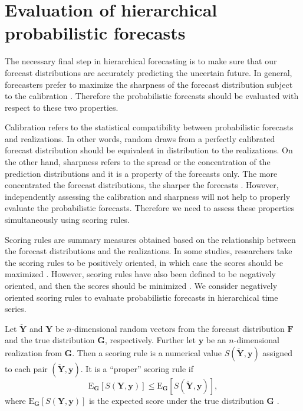 \documentclass[a4paper, 11pt]{article}
\def\E{\text{E}}
\begin{document}
\section{Evaluation of hierarchical probabilistic forecasts}\label{sec:evaluation}

The necessary final step in hierarchical forecasting is to make sure that our forecast distributions are accurately predicting the uncertain future. In general, forecasters prefer to maximize the sharpness of the forecast distribution subject to the calibration \citep{Gneiting2014}. Therefore the probabilistic forecasts should be evaluated with respect to these two properties.

Calibration refers to the statistical compatibility between probabilistic forecasts and realizations. In other words, random draws from a perfectly calibrated forecast distribution should be equivalent in distribution to the realizations. On the other hand, sharpness refers to the spread or the concentration of the prediction distributions and it is a property of the forecasts only. The more concentrated the forecast distributions, the sharper the forecasts \citep{Gneiting2008}. However, independently assessing the calibration and sharpness will not help to properly evaluate the probabilistic forecasts. Therefore we need to assess these properties simultaneously using scoring rules.

Scoring rules are summary measures obtained based on the relationship between the forecast distributions and the realizations. In some studies, researchers take the scoring rules to be positively oriented, in which case the scores should be maximized \citep{Gneiting2007}. However, scoring rules have also been defined to be negatively oriented, and then the scores should be minimized \citep{Gneiting2014}. We consider negatively oriented scoring rules to evaluate probabilistic forecasts in hierarchical time series.

Let $\breve{\bm{Y}}$ and $\bm{Y}$ be $n$-dimensional random vectors from the forecast distribution $\bm{F}$ and the true distribution $\bm{G}$, respectively. Further let $\bm{y}$ be an $n$-dimensional realization from $\bm{G}$. Then a scoring rule is a numerical value $S(\breve{\bm{Y}},\bm{y})$ assigned to each pair $(\breve{\bm{Y}},\bm{y})$. It is a ``proper'' scoring rule if 
\begin{equation}\label{eq:(3.1.)}
\E_{\bm{G}}[S(\bm{Y},\bm{y})] \le \E_{\bm{G}}[S(\breve{\bm{Y}},\bm{y})],
\end{equation}
where $\E_{\bm{G}}[S(\bm{Y,y})]$ is the expected score under the true distribution $\bm{G}$ \citep{Gneiting2008, Gneiting2014}.
\end{document}
